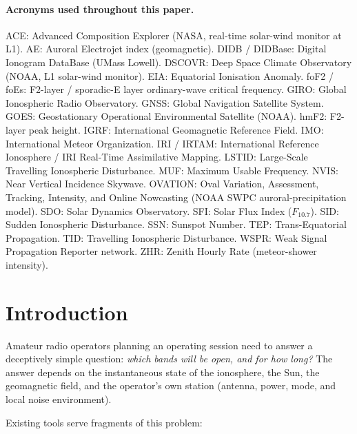 \documentclass[11pt,a4paper]{article}
\begin{document}
\paragraph{Acronyms used throughout this paper.}
ACE: Advanced Composition Explorer (NASA, real-time solar-wind
monitor at L1).
AE: Auroral Electrojet index (geomagnetic).
DIDB / DIDBase: Digital Ionogram DataBase (UMass Lowell).
DSCOVR: Deep Space Climate Observatory (NOAA, L1 solar-wind
monitor).
EIA: Equatorial Ionisation Anomaly.
foF2 / foEs: F2-layer / sporadic-E layer ordinary-wave critical
frequency.
GIRO: Global Ionospheric Radio Observatory.
GNSS: Global Navigation Satellite System.
GOES: Geostationary Operational Environmental Satellite (NOAA).
hmF2: F2-layer peak height.
IGRF: International Geomagnetic Reference Field.
IMO: International Meteor Organization.
IRI / IRTAM: International Reference Ionosphere / IRI Real-Time
Assimilative Mapping.
LSTID: Large-Scale Travelling Ionospheric Disturbance.
MUF: Maximum Usable Frequency.
NVIS: Near Vertical Incidence Skywave.
OVATION: Oval Variation, Assessment, Tracking, Intensity, and Online
Nowcasting (NOAA SWPC auroral-precipitation model).
SDO: Solar Dynamics Observatory.
SFI: Solar Flux Index ($F_{10.7}$).
SID: Sudden Ionospheric Disturbance.
SSN: Sunspot Number.
TEP: Trans-Equatorial Propagation.
TID: Travelling Ionospheric Disturbance.
WSPR: Weak Signal Propagation Reporter network.
ZHR: Zenith Hourly Rate (meteor-shower intensity).

\tableofcontents
\newpage

\section{Introduction}\label{sec:intro}

Amateur radio operators planning an operating session need to answer a
deceptively simple question: \emph{which bands will be open, and for
how long?}  The answer depends on the instantaneous state of the
ionosphere, the Sun, the geomagnetic field, and the operator's own
station (antenna, power, mode, and local noise environment).

Existing tools serve fragments of this problem:
\end{document}
